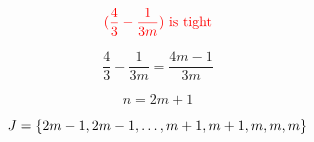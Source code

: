 \begin{frame}{}
  \[
	\textcolor{red}{(\frac{4}{3} - \frac{1}{3m}) \text{ is tight}}
  \]

  \pause
  \[
	\frac{4}{3} - \frac{1}{3m} = \frac{4m-1}{3m}
  \]

  \pause
  \[
	n = 2m + 1
  \]

  \[
	J = \left\{ 2m-1, 2m-1,\dots, m+1, m+1, m,m,m \right\}
  \]
\end{frame}

% 

% 

